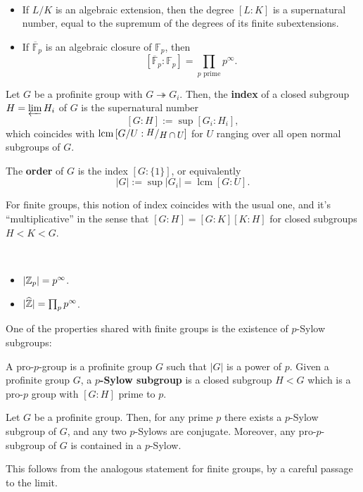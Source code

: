 \documentclass[a4paper, oneside]{memoir}
\begin{document}
\begin{example}\
	\begin{itemize}
		\item If $L/K$ is an algebraic extension, then the degree $[L:K]$ is a supernatural number, equal to the supremum of the degrees of its finite subextensions.
		\item If $\overline{\mathbb{F}}_p$ is an algebraic closure of $\mathbb{F}_p$, then
		      \[
			      [\overline{\mathbb{F}}_p:\mathbb{F}_p] =  \prod_{p\text{ prime}}{p^{\infty}}.
		      \]
	\end{itemize}
\end{example}

\begin{definition}
	Let $G$ be a profinite group with $G \twoheadrightarrow G_i$. Then, the \textbf{index} of a closed subgroup $H=\varprojlim{H_i}$ of $G$ is the supernatural number
	\[
		[G:H]:=\sup[G_i:H_i],
	\] which coincides with $\operatorname{lcm}{[G/U : \sfrac{H}{H\cap U}]}$ for $U$ ranging over all open normal subgroups of $G$.

	The \textbf{order} of $G$ is the index $[G:\{1\}]$, or equivalently
	\[
		|G|:=\sup|G_i|= \operatorname{lcm}{[G:U]}.
	\]
\end{definition}

For finite groups, this notion of index coincides with the usual one, and it's ``multiplicative'' in the sense that $[G:H]=[G:K][K:H]$ for closed subgroups $H<K<G$.

\begin{example}\
	\begin{itemize}
		\item $|\mathbb{Z}_p| = p^{\infty}$.
		\item $|\widehat{\mathbb{Z}}| = \prod_{p}{p^{\infty}}$.
	\end{itemize}
\end{example}

One of the properties shared with finite groups is the existence of $p$-Sylow subgroups:
\begin{definition}
	A pro-$p$-group is a profinite group $G$ such that $|G|$ is a power of $p$. Given a profinite group $G$, a \textbf{$p$-Sylow subgroup} is a closed subgroup $H<G$ which is a pro-$p$ group with $[G:H]$ prime to $p$.
\end{definition}

\begin{proposition}
	Let $G$ be a profinite group. Then, for any prime $p$ there exists a $p$-Sylow subgroup of $G$, and any two $p$-Sylows are conjugate. Moreover, any pro-$p$-subgroup of $G$ is contained in a $p$-Sylow.
\end{proposition}
This follows from the analogous statement for finite groups, by a careful passage to the limit.
\end{document}
